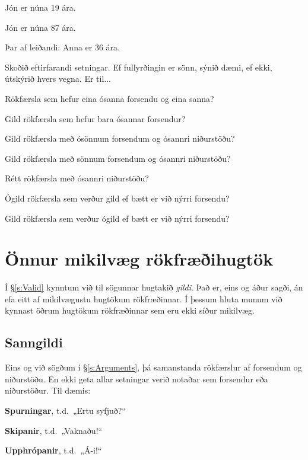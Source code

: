 \begin{earg}
\item Jón er núna 19 ára.
\item Jón er núna 87 ára.
\item[Þar af leiðandi:] Anna er 36 ára.
\end{earg}

\problempart

Skoðið eftirfarandi setningar. Ef fullyrðingin er sönn, sýnið dæmi, ef ekki, útskýrið hvers vegna. Er til...

	\begin{earg}
		\item Rökfærsla sem hefur eina ósanna forsendu og eina sanna?
		\item Gild rökfærsla sem hefur bara ósannar forsendur? 
		\item Gild rökfærsla með ósönnum forsendum og ósannri niðurstöðu?
		\item Gild rökfærsla með sönnum forsendum og ósannri niðurstöðu?
		\item Rétt rökfærsla með ósannri niðurstöðu?
		\item Ógild rökfærsla sem verður gild ef bætt er við nýrri forsendu?
		\item Gild rökfærsla sem verður ógild ef bætt er við nýrri forsendu? 
	\end{earg}
\chapter{Önnur mikilvæg rökfræðihugtök}\label{s:BasicNotions}

Í \S\ref{s:Valid} kynntum við til sögunnar hugtakið \emph{gildi}. Það er, eins og áður sagði, án efa eitt af mikilvægustu hugtökum rökfræðinnar. Í þessum hluta munum við kynnast öðrum hugtökum rökfræðinnar sem eru ekki síður mikilvæg.

\section{Sanngildi}

Eins og við sögðum í \S\ref{s:Arguments}, þá samanstanda rökfærslur af forsendum og niðurstöðu. En ekki geta allar setningar verið notaðar sem forsendur eða niðurstöður. Til dæmis:
	\begin{ebullet}
		\item \textbf{Spurningar}, t.d.\ „Ertu syfjuð?“
		\item \textbf{Skipanir}, t.d.\ „Vaknaðu!“
		\item \textbf{Upphrópanir}, t.d.\ „Á-i!“
	\end{ebullet}
	
